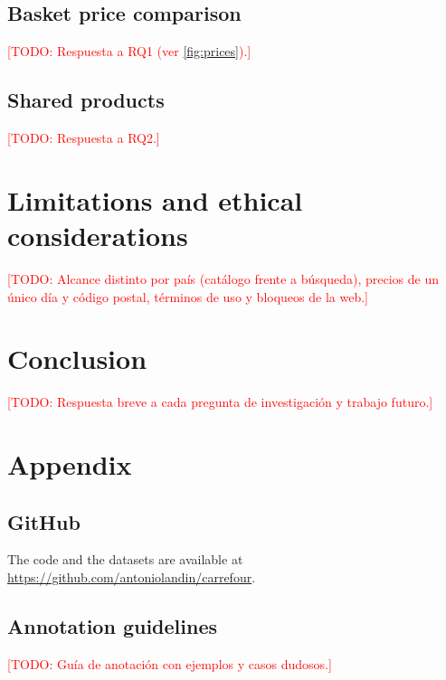 \documentclass[11pt,a4paper,twocolumn]{article}
\newcommand{\todo}[1]{\textcolor{red}{[TODO: #1]}}
\newcommand{\githuburl}{https://github.com/antoniolandin/carrefour}
\begin{document}
\subsection{Basket price comparison}
\todo{Respuesta a RQ1 (ver \cref{fig:prices}).}

\subsection{Shared products}
\todo{Respuesta a RQ2.}

\section{Limitations and ethical considerations}
\todo{Alcance distinto por país (catálogo frente a búsqueda), precios de un único día y código postal, términos de uso y bloqueos de la web.}

\section{Conclusion}
\todo{Respuesta breve a cada pregunta de investigación y trabajo futuro.}

\printbibliography[heading=bibintoc]

\appendix
\section{Appendix}

\subsection{GitHub}
\label{app:github}
The code and the datasets are available at \url{\githuburl}.

\subsection{Annotation guidelines}
\todo{Guía de anotación con ejemplos y casos dudosos.}
\end{document}
